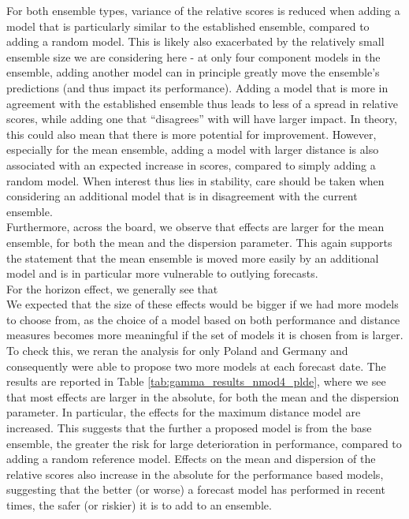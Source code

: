 For both ensemble types, variance of the relative scores is reduced when adding a model that is particularly similar to the established ensemble, compared to adding a random model. This is likely also exacerbated by the relatively small ensemble size we are considering here - at only four component models in the ensemble, adding another model can in principle greatly move the ensemble's predictions (and thus impact its performance). Adding a model that is more in agreement with the established ensemble thus leads to less of a spread in relative scores, while adding one that ``disagrees'' with will have larger impact. In theory, this could also mean that there is more potential for improvement. However, especially for the mean ensemble, adding a model with larger distance is also associated with an expected increase in scores, compared to simply adding a random model. When interest thus lies in stability, care should be taken when considering an additional model that is in disagreement with the current ensemble.\\
Furthermore, across the board, we observe that effects are larger for the mean ensemble, for both the mean and the dispersion parameter. This again supports the statement that the mean ensemble is moved more easily by an additional model and is in particular more vulnerable to outlying forecasts. \\
For the horizon effect, we generally see that 
\\
We expected that the size of these effects would be bigger if we had more models to choose from, as the choice of a model based on both performance and distance measures becomes more meaningful if the set of models it is chosen from is larger. To check this, we reran the analysis for only Poland and Germany and consequently were able to propose two more models at each forecast date. The results are reported in Table \ref{tab:gamma_results_nmod4_plde}, where we see that most effects are larger in the absolute, for both the mean and the dispersion parameter. In particular, the effects for the maximum distance model are increased. This suggests that the further a proposed model is from the base ensemble, the greater the risk for large deterioration in performance, compared to adding a random reference model. Effects on the mean and dispersion of the relative scores also increase in the absolute for the performance based models, suggesting that the better (or worse) a forecast model has performed in recent times, the safer (or riskier) it is to add to an ensemble.\\

